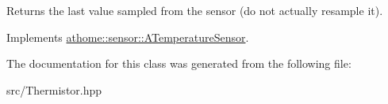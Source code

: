 Returns the last value sampled from the sensor (do not actually resample it). 

Implements \mbox{\hyperlink{classathome_1_1sensor_1_1_a_temperature_sensor_a4e5b2c79ab69f6903f7b322da45b0af4}{athome\+::sensor\+::\+A\+Temperature\+Sensor}}.



The documentation for this class was generated from the following file\+:\begin{DoxyCompactItemize}
\item 
src/Thermistor.\+hpp\end{DoxyCompactItemize}
